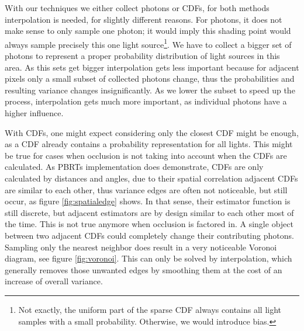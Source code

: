 With our techniques we either collect photons or CDFs, for both methods interpolation is needed, for slightly different reasons. For photons, it does not make sense to only sample one photon; it would imply this shading point would always sample precisely this one light source\footnote{Not exactly, the uniform part of the sparse CDF always contains all light samples with a small probability. Otherwise, we would introduce bias.}. We have to collect a bigger set of photons to represent a proper probability distribution of light sources in this area. As this sets get bigger interpolation gets less important because for adjacent pixels only a small subset of collected photons change, thus the probabilities and resulting variance changes insignificantly. As we lower the subset to speed up the process, interpolation gets much more important, as individual photons have a higher influence.

With CDFs, one might expect considering only the closest CDF might be enough, as a CDF already contains a probability representation for all lights. This might be true for cases when occlusion is not taking into account when the CDFs are calculated. As PBRTs implementation does demonstrate, CDFs are only calculated by distances and angles, due to their spatial correlation adjacent CDFs are similar to each other, thus variance edges are often not noticeable, but still occur, as figure \ref{fig:spatialedge} shows. In that sense, their estimator function is still discrete, but adjacent estimators are by design similar to each other most of the time. This is not true anymore when occlusion is factored in. A single object between two adjacent CDFs could completely change their contributing photons. Sampling only the nearest neighbor does result in a very noticeable Voronoi diagram, see figure \ref{fig:voronoi}. This can only be solved by interpolation, which generally removes those unwanted edges by smoothing them at the cost of an increase of overall variance.

